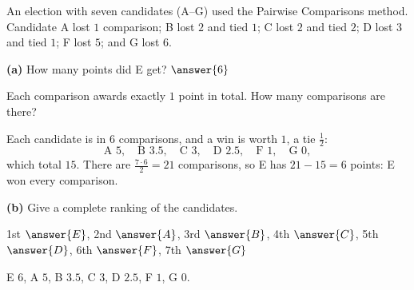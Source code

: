 \documentclass[12pt]{ximera}
\begin{document}
\begin{problem}
An election with seven candidates (A--G) used the Pairwise Comparisons method. Candidate
A lost $1$ comparison; B lost $2$ and tied $1$; C lost $2$ and tied $2$; D lost $3$ and
tied $1$; F lost $5$; and G lost $6$.

\begin{prompt}
\textbf{(a)} How many points did E get? $\answer{6}$

\begin{hint}
Each comparison awards exactly $1$ point in total. How many comparisons are there?
\end{hint}

\begin{feedback}
Each candidate is in $6$ comparisons, and a win is worth $1$, a tie $\frac12$:
\[
\text{A } 5,\quad \text{B } 3.5,\quad \text{C } 3,\quad \text{D } 2.5,\quad
\text{F } 1,\quad \text{G } 0,
\]
which total $15$. There are $\frac{7\cdot6}{2}=21$ comparisons, so E has
$21-15=6$ points: E won every comparison.
\end{feedback}
\end{prompt}

\begin{prompt}
\textbf{(b)} Give a complete ranking of the candidates.

1st $\answer{E}$, 2nd $\answer{A}$, 3rd $\answer{B}$, 4th $\answer{C}$, 5th $\answer{D}$,
6th $\answer{F}$, 7th $\answer{G}$

\begin{feedback}
E $6$, A $5$, B $3.5$, C $3$, D $2.5$, F $1$, G $0$.
\end{feedback}
\end{prompt}
\end{problem}
\end{document}

